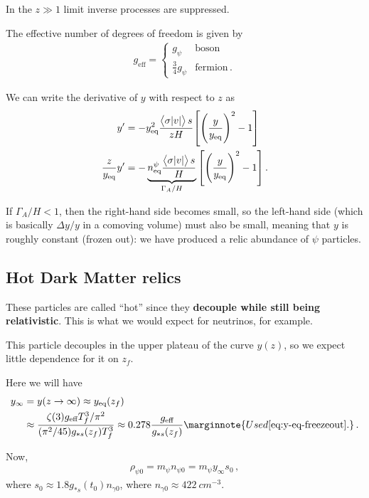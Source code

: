 \documentclass[main.tex]{subfiles}
\begin{document}
In the \(z \gg 1\) limit inverse processes are suppressed.

The effective number of degrees of freedom is given by 
%
\begin{align}
g _{\text{eff}} = \begin{cases}
    g_\psi & \text{boson} \\
    \frac{3}{4} g_\psi & \text{fermion} 
\,.
\end{cases}
\end{align}

We can write the derivative of \(y\) with respect to \(z\) as 
%
\begin{align}
y' &= - y^2 _{\text{eq}} \frac{\expval{\sigma \abs{v}} s}{zH} \qty[ \qty(\frac{y}{y _{\text{eq}}})^2 - 1] \\
\frac{z}{y _{\text{eq}}} y' &= - \underbrace{n^\psi  _{\text{eq}} \frac{\expval{\sigma \abs{v}} s}{H}}_{\Gamma_A / H} \qty[ \qty(\frac{y}{y _{\text{eq}}})^2 - 1] 
\,.
\end{align}

If \(\Gamma _A / H <1\), then the right-hand side becomes small, so the left-hand side (which is basically \(\Delta y / y\) in a comoving volume) must also be small, meaning that \(y\) is roughly constant (frozen out): we have produced a relic abundance of \(\psi \) particles.

\subsection{Hot Dark Matter relics}

These particles are called ``hot'' since they \textbf{decouple while still being relativistic}. This is what we would expect for neutrinos, for example. 

This particle decouples in the upper plateau of the curve \(y(z)\), so we expect little dependence for it on \(z_f\). 

Here we will have 
%
\begin{align}
y_\infty &= y(z \to \infty ) \approx y _{\text{eq}} (z_f)  \\
&\approx \frac{\zeta (3) g _{\text{eff}}T_f^3 / \pi^2}{(\pi^2 / 45) g_{*s } (z_f) T_f^3} \approx \num{.278} \frac{g _{\text{eff}}}{g_{*s} (z_f)}
\marginnote{Used \eqref{eq:y-eq-freezeout}.}
\,.
\end{align}

Now, 
%
\begin{align}
\rho_{\psi 0 } = m_\psi n_{\psi 0 } = m_\psi y_\infty s_0 
\,,
\end{align}
%
where \(s_0 \approx 1.8 g_{*s} (t_0 ) n_{\gamma 0 }\), where \(n_{\gamma 0} \approx \SI{422}{cm^{-3}}\). 
\end{document}

